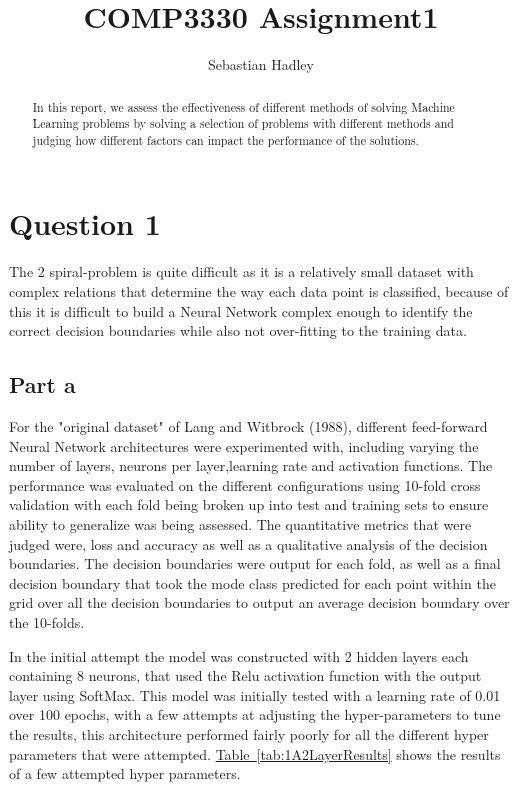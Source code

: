 \documentclass[runningheads]{llncs}
\begin{document}
\title{COMP3330 Assignment1}
\author{Sebastian Hadley}
\maketitle

\begin{abstract}
In this report, we assess the effectiveness of different methods of solving Machine Learning problems by solving a selection of problems with different methods and judging how different factors can impact the performance of the solutions.
\end{abstract}
\section{Question 1}

The 2 spiral-problem is quite difficult as it is a relatively small dataset with complex relations that determine the way each data point is classified, because of this it is difficult to build a Neural Network complex enough to identify the correct decision boundaries while also not over-fitting to the training data.
 
\subsection{Part a}

 For the "original dataset" of Lang and Witbrock (1988), different feed-forward Neural Network architectures were experimented with, including varying the number of layers, neurons per layer,learning rate and activation functions. The performance was evaluated on  the different configurations using 10-fold cross validation with each fold being broken up into test and training sets to ensure ability to generalize was being assessed. The quantitative metrics that were judged were, loss and accuracy as well as a qualitative analysis of the decision boundaries. The decision boundaries were output for each fold, as well as a final decision boundary that took the mode class predicted for each point within the grid over all the decision boundaries to output an average decision boundary over the 10-folds.

In the initial attempt the model was constructed with 2 hidden layers each containing 8 neurons, that used the Relu activation function with the output layer using SoftMax. This model was initially tested with a learning rate of 0.01 over 100 epochs, with a few attempts at adjusting the hyper-parameters to tune the results, this architecture performed fairly poorly for all the different hyper parameters that were attempted. \hyperref[tab:1A2LayerResults]{Table~\ref*{tab:1A2LayerResults}} shows the results of a few attempted hyper parameters.
\end{document}

